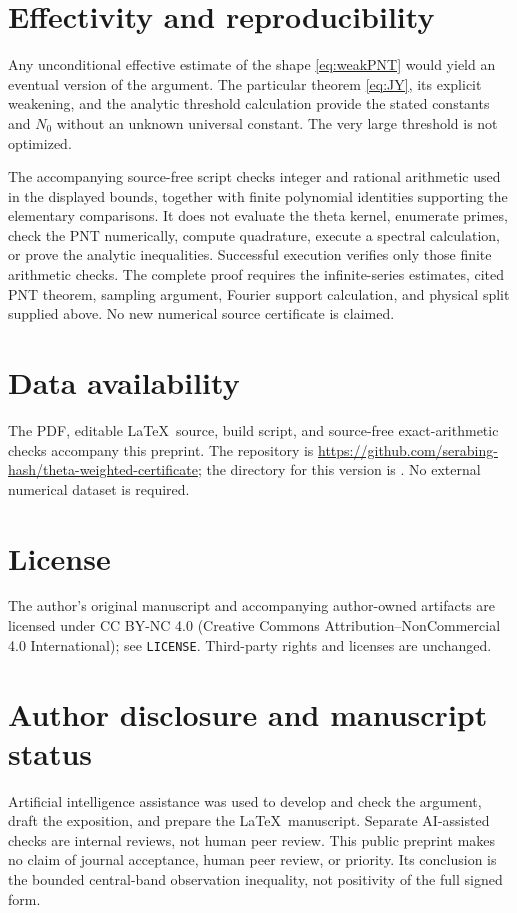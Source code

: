 \documentclass[11pt]{article}
\theoremstyle{remark}\newtheorem{remark}[theorem]{Remark}
\numberwithin{equation}{section}
\begin{document}
\section{Effectivity and reproducibility}\label{sec:repro}
Any unconditional effective estimate of the shape \eqref{eq:weakPNT} would yield an eventual version of the argument. The particular theorem \eqref{eq:JY}, its explicit weakening, and the analytic threshold calculation provide the stated constants and $N_0$ without an unknown universal constant. The very large threshold is not optimized.

The accompanying source-free script checks integer and rational arithmetic used in the displayed bounds, together with finite polynomial identities supporting the elementary comparisons. It does not evaluate the theta kernel, enumerate primes, check the PNT numerically, compute quadrature, execute a spectral calculation, or prove the analytic inequalities. Successful execution verifies only those finite arithmetic checks. The complete proof requires the infinite-series estimates, cited PNT theorem, sampling argument, Fourier support calculation, and physical split supplied above. No new numerical source certificate is claimed.

\section*{Data availability}
The PDF, editable \LaTeX\ source, build script, and source-free exact-arithmetic checks accompany this preprint. The repository is
\url{https://github.com/serabing-hash/theta-weighted-certificate};
the directory for this version is
.
No external numerical dataset is required.

\section*{License}
The author's original manuscript and accompanying author-owned artifacts are licensed under CC BY-NC 4.0 (Creative Commons Attribution--NonCommercial 4.0 International); see \texttt{LICENSE}. Third-party rights and licenses are unchanged.

\section*{Author disclosure and manuscript status}
Artificial intelligence assistance was used to develop and check the argument, draft the exposition, and prepare the \LaTeX\ manuscript. Separate AI-assisted checks are internal reviews, not human peer review. This public preprint makes no claim of journal acceptance, human peer review, or priority. Its conclusion is the bounded central-band observation inequality, not positivity of the full signed form.
\end{document}
